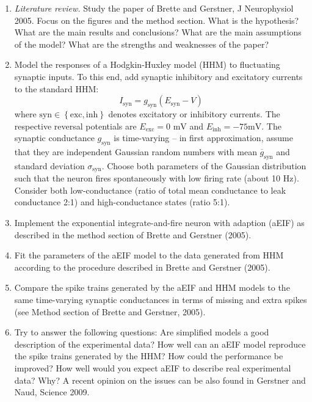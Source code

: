 \documentclass[12pt]{article}
\begin{document}
\begin{enumerate}
    \item \textit{Literature review.} Study the paper of Brette and
        Gerstner,  J Neurophysiol 2005. Focus on the figures and  the method
        section. What is the hypothesis? What are the main results
        and conclusions? What are the main assumptions of the model?
        What are the strengths and weaknesses of the paper?

    \item Model the responses of a Hodgkin-Huxley model (HHM) to fluctuating
        synaptic inputs. To this end, add synaptic
        inhibitory and excitatory currents to the standard HHM:
        \begin{equation}
            I_\mathrm{syn}=g_\mathrm{syn}(E_\mathrm{syn}-V)
            \label{eq:syn_current}
        \end{equation}
        where $\mathrm{syn} \in  \left\{\mathrm{exc},
        \mathrm{inh}\right\}$ denotes excitatory or inhibitory
        currents. The respective reversal potentials are
        $E_\mathrm{exc}=0\text{ mV}$ and $E_\mathrm{inh}=-75\text{
        mV}$. The synaptic conductance $g_\mathrm{syn}$ is
        time-varying --  in first approximation, assume that
        they are independent Gaussian random numbers with mean
        $\overline{g}_\mathrm{syn}$ and standard deviation
        $\sigma_\mathrm{syn}$. Choose both parameters of the
        Gaussian distribution such that the neuron fires spontaneously
        with low firing rate (about 10 Hz). Consider both
        low-conductance (ratio of total mean conductance to leak conductance
        2:1) and high-conductance states (ratio 5:1).

    \item Implement the exponential integrate-and-fire neuron with
        adaption (aEIF) as described in the method section of
        Brette and Gerstner (2005).

    \item Fit the parameters of the aEIF model to the data generated from
        HHM according to the procedure described in Brette and
        Gerstner (2005).

    \item Compare the spike trains generated by the aEIF and HHM models
        to the same time-varying synaptic conductances in terms of
        missing and extra spikes (see Method section of Brette and
        Gerstner, 2005).

    \item Try to answer the following questions: Are simplified
        models a good description of the experimental data? How well
        can an aEIF  model reproduce the spike  trains generated by the HHM?
        How could the performance be improved? How well would you expect
        aEIF to describe real experimental data? Why?  A recent
        opinion on the issues can be also found in Gerstner and Naud,
        Science 2009.

\end{enumerate}
\end{document}
